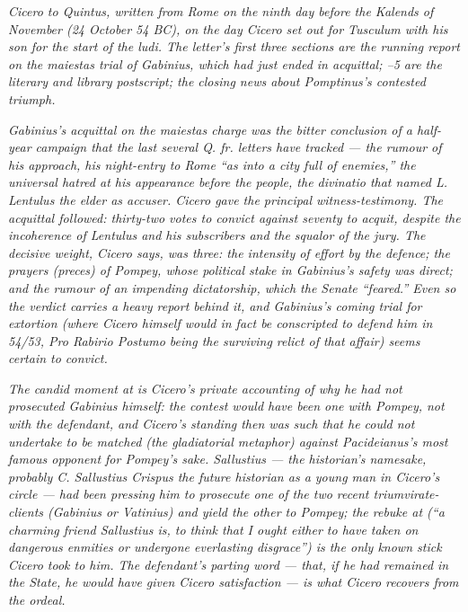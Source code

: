 
\textit{Cicero to Quintus, written from Rome on the ninth day
before the Kalends of November (24 October 54 BC), on the day
Cicero set out for Tusculum with his son for the start of the
ludi. The letter's first three sections are the running
report on the \textit{maiestas} trial of Gabinius, which had
just ended in acquittal; \textsection{}--5 are
the literary and library postscript;  the
closing news about Pomptinus's contested triumph.}

\textit{Gabinius's acquittal on the \textit{maiestas} charge
was the bitter conclusion of a half-year campaign that the
last several Q. fr. letters have tracked --- the rumour of
his approach, his night-entry to Rome ``as into a city full
of enemies,'' the universal hatred at his appearance before
the people, the divinatio that named L. Lentulus the elder
as accuser. Cicero gave the principal witness-testimony.
The acquittal followed: thirty-two votes to convict against
seventy to acquit, despite the incoherence of Lentulus and
his subscribers and the squalor of the jury. The decisive
weight, Cicero says, was three: the intensity of effort by
the defence; the prayers (\textit{preces}) of Pompey, whose
political stake in Gabinius's safety was direct; and the
rumour of an impending dictatorship, which the Senate
``feared.'' Even so the verdict carries a heavy report behind
it, and Gabinius's coming trial for extortion (where Cicero
himself would in fact be conscripted to defend him in 54/53,
\textit{Pro Rabirio Postumo} being the surviving relict of
that affair) seems certain to convict.}

\textit{The candid moment at  is Cicero's
private accounting of why he had not prosecuted Gabinius
himself: the contest would have been one with Pompey, not
with the defendant, and Cicero's standing then was such that
he could not undertake to be matched (the gladiatorial
metaphor) against Pacideianus's most famous opponent for
Pompey's sake. Sallustius --- the historian's namesake,
probably C. Sallustius Crispus the future historian as a
young man in Cicero's circle --- had been pressing him to
prosecute one of the two recent triumvirate-clients (Gabinius
or Vatinius) and yield the other to Pompey; the rebuke at
 (``a charming friend Sallustius is, to think
that I ought either to have taken on dangerous enmities or
undergone everlasting disgrace'') is the only known stick
Cicero took to him. The defendant's parting word --- that, if
he had remained in the State, he would have given Cicero
satisfaction --- is what Cicero recovers from the ordeal.}

